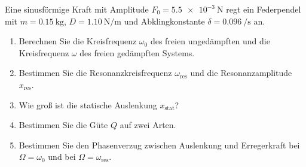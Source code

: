 \begin{ExerciseBlock}
Eine sinusförmige Kraft mit Amplitude $F_0=\qty{5.5e-3}{\newton}$ regt ein Federpendel mit $m=\qty{0.15}{\kilogram}$, $D=\qty{1.10}{\newton\per\metre}$ und Abklingkonstante $\delta=\qty{0.096}{\per\second}$ an.
\begin{enumerate}
\item Berechnen Sie die Kreisfrequenz $\omega_0$ des freien ungedämpften und die Kreisfrequenz $\omega$ des freien gedämpften Systems.
\item Bestimmen Sie die Resonanzkreisfrequenz $\omega_\mathrm{res}$ und die Resonanzamplitude $x_\mathrm{res}$.
\item Wie groß ist die statische Auslenkung $x_\mathrm{stat}$?
\item Bestimmen Sie die Güte $Q$ auf zwei Arten.
\item Bestimmen Sie den Phasenverzug zwischen Auslenkung und Erregerkraft bei $\Omega=\omega_0$ und bei $\Omega=\omega_\mathrm{res}$.
\end{enumerate}
\end{ExerciseBlock}
